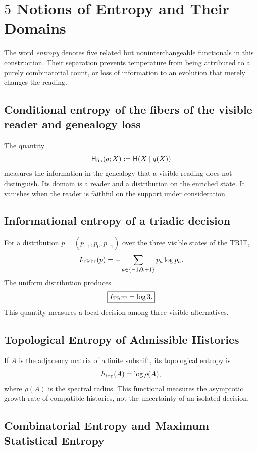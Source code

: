 \section{\(5\) Notions of Entropy and Their Domains}

The word \emph{entropy} denotes five related but
noninterchangeable functionals in this construction. Their separation prevents temperature
from being attributed to a purely combinatorial count, or loss of information to an evolution
that merely changes the reading.

\subsection{Conditional entropy of the fibers of the visible reader and genealogy loss}

The quantity
\[
 \mathsf H_{\rm fib}(q;X):=\mathsf H(X\mid q(X))
\]
measures the information in the genealogy that a visible reading does not distinguish.
Its domain is a reader and a distribution on the enriched state. It
vanishes when the reader is faithful on the support under consideration.

\subsection{Informational entropy of a triadic decision}

For a distribution \(p=(p_{-1},p_0,p_{+1})\) over the three visible
states of the TRIT,
\[
 I_{\rm TRIT}(p)=-\sum_{a\in\{-1,0,+1\}}p_a\log p_a.
\]
The uniform distribution produces
\begin{equation}
 \boxed{I_{\rm TRIT}=\log3.}
 \label{eq:informacion-trit-log3-anexo}
\end{equation}
This quantity measures a local decision among three visible alternatives.

\subsection{Topological Entropy of Admissible Histories}

If \(A\) is the adjacency matrix of a finite subshift, its topological
entropy is
\[
 h_{\rm top}(A)=\log\rho(A),
\]
where \(\rho(A)\) is the spectral radius. This functional measures the
asymptotic growth rate of compatible histories, not the uncertainty
of an isolated decision.

\subsection{Combinatorial Entropy and Maximum Statistical Entropy}


